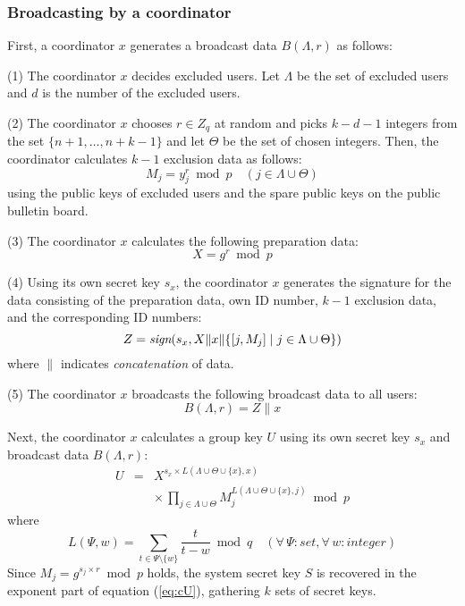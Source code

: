\documentclass{ims9x6}
\begin{document}
\subsubsection{Broadcasting by a coordinator}
First, a coordinator $x$ generates a broadcast data $B(\Lambda, r)$ as
follows:
\begin{arabiclist}[(2)]
\item[(1)] The coordinator $x$ decides excluded users. Let $\Lambda$
be the set of excluded users and $d$ is the number of the excluded
users.
\item[(2)] The coordinator $x$ chooses $r\in Z_q$ at random and
picks $k-d-1$ integers from the set $\{n+1,\ldots,n+k-1\}$ and let
$\Theta$ be the set of chosen integers. Then, the coordinator
calculates $k-1$ exclusion data as follows:
\begin{equation}	%
M_j=y_j^r\bmod p\quad (j\in\Lambda\cup\Theta)
\label{eq:RD}
\end{equation}
using the public keys of excluded users and the spare public keys on
the public bulletin board.
\item[(3)] The coordinator $x$ calculates the following preparation
data:
\begin{equation}	%
X=g^r\bmod p
\end{equation}
\item[(4)] Using its own secret key $s_x$, the coordinator $x$
generates the signature for the data consisting of the preparation
data, own ID number, $k-1$ exclusion data, and the corresponding ID
numbers:
\begin{equation}	%
Z=\hbox{\it sign}(s_x,X\|x\|\{[j,M_{j}]\mid j\in\Lambda\cup\Theta\})
\end{equation}
where $\|$ indicates {\em concatenation} of data.
\item[(5)] The coordinator $x$ broadcasts the following broadcast data
to all users:
\begin{equation}	%
B(\Lambda,r)=Z\|x
\label{eq:BD}
\end{equation}
\end{arabiclist}

Next, the coordinator $x$ calculates a group key $U$ using its own
secret key $s_{x}$ and broadcast data $B(\Lambda,r)$:
\begin{eqnarray}	%
U &=&X^{s_x\times L(\Lambda\cup\Theta\cup\{x\},x)}\nonumber\\[2pt]
&&\times\,\prod_{j\in\Lambda\cup\Theta}
M_j^{L(\Lambda\cup\Theta\cup\{x\},j)}\bmod p
\label{eq:cU}
\end{eqnarray}
where
\begin{equation}	%
L(\Psi,w)=\sum_{t\in\Psi\setminus\{w\}}
\frac{t}{t-w}\bmod q\quad (\forall\,\Psi: set,\forall\,w:integer)
\label{eq:LIP}
\end{equation}
Since $M_j=g^{s_j\times r}\bmod p$ holds, the system secret key $S$ is
recovered in the exponent part of equation (\ref{eq:cU}), gathering
$k$ sets of secret keys.
\end{document}
